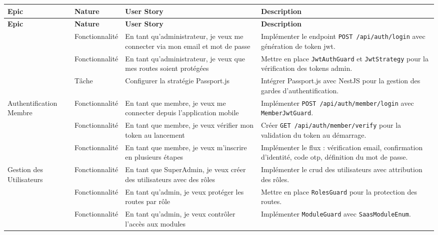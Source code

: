 ﻿\documentclass[../main.tex]{subfiles}
\begin{document}
\begin{longtable}{|p{3cm}|p{2.5cm}|p{4cm}|p{5cm}|}
\hline
\textbf{Epic} & \textbf{Nature} & \textbf{User Story} & \textbf{Description} \\
\hline
\endfirsthead
\hline
\textbf{Epic} & \textbf{Nature} & \textbf{User Story} & \textbf{Description} \\
\hline
\endhead
\hline
\endfoot

\multirow{3}{3cm}{Authentification Admin} & Fonctionnalit\'{e} & En tant qu'administrateur, je veux me connecter via mon email et mot de passe & Impl\'{e}menter le endpoint \texttt{POST /api/auth/login} avec g\'{e}n\'{e}ration de token \acrshort{jwt}. \\
\cline{2-4}
& Fonctionnalit\'{e} & En tant qu'administrateur, je veux que mes routes soient prot\'{e}g\'{e}es & Mettre en place \texttt{JwtAuthGuard} et \texttt{JwtStrategy} pour la v\'{e}rification des tokens admin. \\
\cline{2-4}
& T\^{a}che & Configurer la strat\'{e}gie Passport.js & Int\'{e}grer Passport.js avec NestJS pour la gestion des gardes d'authentification. \\
\hline

\multirow{3}{3cm}{Authentification Membre} & Fonctionnalit\'{e} & En tant que membre, je veux me connecter depuis l'application mobile & Impl\'{e}menter \texttt{POST /api/auth/member/login} avec \texttt{MemberJwtGuard}. \\
\cline{2-4}
& Fonctionnalit\'{e} & En tant que membre, je veux v\'{e}rifier mon token au lancement & Cr\'{e}er \texttt{GET /api/auth/member/verify} pour la validation du token au d\'{e}marrage. \\
\cline{2-4}
& Fonctionnalit\'{e} & En tant que membre, je veux m'inscrire en plusieurs \'{e}tapes & Impl\'{e}menter le flux : v\'{e}rification email, confirmation d'identit\'{e}, code \acrshort{otp}, d\'{e}finition du mot de passe. \\
\hline

\multirow{3}{3cm}{Gestion des Utilisateurs} & Fonctionnalit\'{e} & En tant que SuperAdmin, je veux cr\'{e}er des utilisateurs avec des r\^{o}les & Impl\'{e}menter le \acrshort{crud} des utilisateurs avec attribution des r\^{o}les. \\
\cline{2-4}
& Fonctionnalit\'{e} & En tant qu'admin, je veux prot\'{e}ger les routes par r\^{o}le & Mettre en place \texttt{RolesGuard} pour la protection des routes. \\
\cline{2-4}
& Fonctionnalit\'{e} & En tant qu'admin, je veux contr\^{o}ler l'acc\`{e}s aux modules & Impl\'{e}menter \texttt{ModuleGuard} avec \texttt{SaasModuleEnum}. \\
\hline


\end{longtable}
\end{document}
